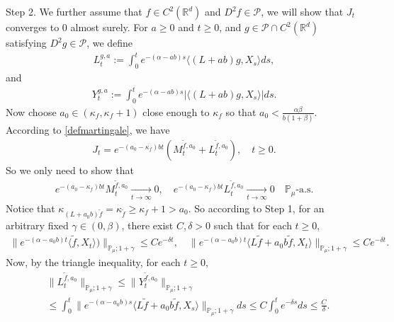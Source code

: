 \documentclass[12pt,a4paper]{amsart}
\theoremstyle{plain}
\theoremstyle{definition}
\numberwithin{equation}{section}
\begin{document}
	Step 2.
	We further assume that $f\in C^2(\mathbb R^d)$ and $D^2f \in \mathcal{P}$, we will show that $J_t$ converges to $0$ almost surely.
	For $a \geq 0$ and $ t\geq 0$, and $g\in \mathcal{P}\cap C^2(\mathbb{R}^d)$ satisfying $D^2g\in \mathcal{P}$, we define
\begin{equation}\begin{split}
	L_t^{g,a}:=\int_0^t e^{-(\alpha-ab)s}\langle (L+ab)g,X_s\rangle ds,
\end{split}\end{equation}
    and
\begin{equation}\begin{split}
    Y_t^{g,a}
    :=\int_0^t e^{-(\alpha-ab)s}|\langle (L+ab)g,X_s\rangle|ds.
\end{split}\end{equation}
	Now choose $a_0 \in (\kappa_{f}, \kappa_f + 1)$ close enough to $\kappa_f$ so that $a_0 < \frac{\alpha \beta}{b(1+\beta)}$.
	According to \eqref{defmartingale}, we have
\begin{align*}
    J_t
    =e^{-(a_0-\kappa_f)bt} (M_t^{\tilde{f}, a_0}+L_t^{\tilde{f}, a_0}),
    \quad t\geq 0.
\end{align*}
	So we only need to show that
\begin{align*}
    e^{-(a_0-\kappa_f)b t}M_t^{\tilde{f},a_0}
    \xrightarrow[t\to \infty]{} 0,
    \quad e^{-(a_0-\kappa_f)b t}L_t^{\tilde{f},a_0}
    \xrightarrow[t\to \infty]{} 0
    \quad \mathbb{P}_{\mu}\text{-a.s.}
\end{align*}
	Notice that $\kappa_{(L+a_0 b)\tilde{f}}=\kappa_{\tilde{f}}\geq \kappa_f+1 > a_0$.
	So according to Step 1, for an arbitrary fixed $\gamma\in (0,\beta)$, there exist $C, \delta>0$ such that for each $t\geq 0$,
\begin{equation}\begin{split}
    \|e^{-(\alpha-a_0 b)t}\langle \tilde{f},X_t\rangle)\|_{\mathbb{P}_{\mu};1+\gamma}
    \leq C e^{-\delta t},
    \quad \|e^{-(\alpha-a_0 b)t}\langle L\tilde{f}+a_0 b\tilde{f},X_t\rangle\|_{\mathbb{P}_{\mu};1+\gamma}
    \leq C e^{-\delta t}.
\end{split}\end{equation}
	Now, by the triangle inequality, for each $t\geq 0$,
\begin{align*}
    &\|L_t^{\tilde{f},a_0}\|_{\mathbb{P}_{\mu};1+\gamma}
    \leq\|Y_t^{\tilde{f},a_0}\|_{\mathbb{P}_{\mu};1+\gamma}
    \\&\leq \int_0^t \|e^{-(\alpha-a_0 b)s}\langle L\tilde{f}+a_0 b\tilde{f},X_s\rangle\|_{\mathbb{P}_{\mu};1+\gamma}ds\leq C \int_0^t e^{-\delta s}ds\leq\frac{C}{\delta}.
\end{align*}
\end{document}
